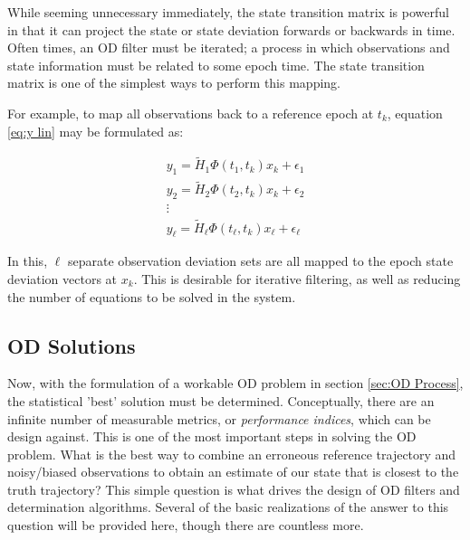 \documentclass[12pt,a4paper,oneside]{article}
\numberwithin{equation}{section}   		%
\begin{document}
While seeming unnecessary immediately, the state transition matrix is powerful in that it can project the state or state deviation forwards or backwards in time. Often times, an OD filter must be iterated; a process in which observations and state information must be related to some epoch time. The state transition matrix is one of the simplest ways to perform this mapping. 

For example, to map all observations back to a reference epoch at $t_k$, equation \eqref{eq:y lin} may be formulated as:

\begin{eqnarray}
	y_1 = \tilde{H}_1 \Phi(t_1,t_k) x_k + \epsilon_1				\nonumber	\\
	y_2 = \tilde{H}_2 \Phi(t_2,t_k) x_k + \epsilon_2							\\
	\vdots											\nonumber	\\
	y_\ell = \tilde{H}_\ell \Phi(t_\ell,t_k) x_\ell + \epsilon_\ell		\nonumber
\end{eqnarray}

In this, $\ell$ separate observation deviation sets are all mapped to the epoch state deviation vectors at $x_k$. This is desirable for iterative filtering, as well as reducing the number of equations to be solved in the system. 


\subsection{OD Solutions}
\label{sec:OD Solutions}
Now, with the formulation of a workable OD problem in section \ref{sec:OD Process}, the statistical 'best' solution must be determined. Conceptually, there are an infinite number of measurable metrics, or \emph{performance indices}, which can be design against. This is one of the most important steps in solving the OD problem. What is the best way to combine an erroneous reference trajectory and noisy/biased observations to obtain an estimate of our state that is closest to the truth trajectory? This simple question is what drives the design of OD filters and determination algorithms. Several of the basic realizations of the answer to this question will be provided here, though there are countless more. 


\end{document}
